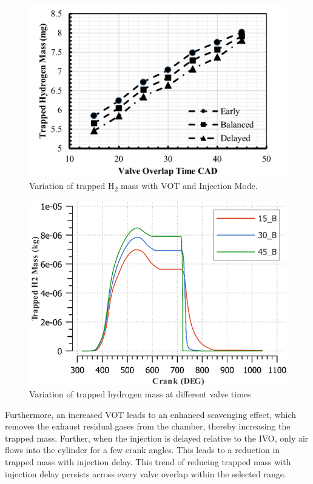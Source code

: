 \documentclass[conference]{IEEEtran}
\begin{document}
\begin{figure}[htbp]
    \centerline{\includegraphics{plots and graphs/3.png}}
    \caption{Variation of trapped H\textsubscript{2} mass with VOT and Injection Mode.}
    \label{plt_3}
    \end{figure}


\begin{figure}[htbp]
    \centerline{\includegraphics{plots and graphs/4.png}}
    \caption{Variation of trapped hydrogen mass at different valve times}
    \label{plt_4}
    \end{figure}

Furthermore, an increased VOT leads to an enhanced scavenging effect, which removes the exhaust residual gases from the chamber, thereby increasing the trapped mass. 
Further, when the injection is delayed relative to the IVO, only air flows into the cylinder for a few crank angles. 
This leads to a reduction in trapped mass with injection delay. 
This trend of reducing trapped mass with injection delay persists across every valve overlap within the selected range.\\
\end{document}
